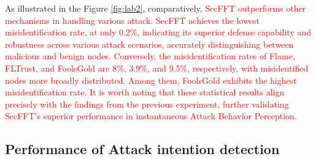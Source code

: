 \documentclass[lettersize,journal]{IEEEtran}
\begin{document}
As illustrated in the Figure \ref{fig:lab2}, comparatively, \textcolor{red}{SecFFT outperforms other mechanisms in handling various attack. SecFFT achieves the lowest misidentification rate, at only 0.2\%, indicating its superior defense capability and robustness across various attack scenarios, accurately distinguishing between malicious and benign nodes. Conversely, the misidentification rates of Flame, FLTrust, and FoolsGold are 8\%, 3.9\%, and 9.5\%, respectively, with misidentified nodes more broadly distributed. Among them, FoolsGold exhibits the highest misidentification rate. It is worth noting that these statistical results align precisely with the findings from the previous experiment, further validating SecFFT's superior performance in instantaneous Attack Behavior Perception.}

\vspace{-0.28cm}
\subsection{Performance of Attack intention detection}
\end{document}
